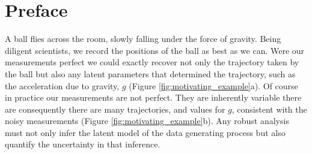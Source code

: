 \chapter*{Preface}

A ball flies across the room, slowly falling under the force of gravity.
Being diligent scientists, we record the positions of the ball as best
as we can.  Were our measurements perfect we could exactly recover 
not only the trajectory taken by the ball but also any latent parameters
that determined the trajectory, such as the acceleration due to gravity, 
$g$ (Figure \ref{fig:motivating_example}a).  Of course in practice our
measurements are not perfect.  They are inherently variable there are 
consequently there are many trajectories, and values for $g$, consistent 
with the noisy measurements (Figure \ref{fig:motivating_example}b).
Any robust analysis must not only infer the latent model of the data
generating process but also quantify the uncertainty in that inference.


